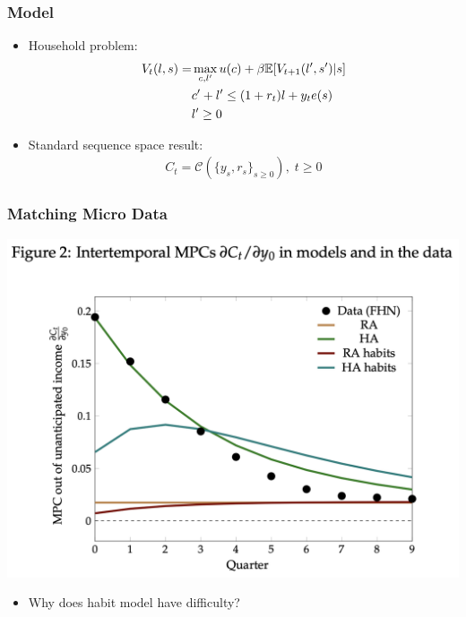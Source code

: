 \documentclass[english,xcolor=svgnames]{beamer}
\begin{document}
\begin{frame}
    \frametitle{Model}
    \begin{itemize}
        \item Household problem:
        \begin{align*}
        	V_t(l,s) = &\max_{c,l'}u(c)+\beta\mathbb{E}[V_{t+1}(l',s')|s] \\
        	&c'+l' \le (1+r_t)l + y_t e(s) \\
        	& l'\ge 0
        \end{align*}
        \item Standard sequence space result:
        \begin{align*}
        	C_t = \mathcal{C}(\{y_s,r_s\}_{s\ge 0}), \;t\ge 0
        \end{align*}
    \end{itemize}
\end{frame}

\begin{frame}
    \frametitle{Matching Micro Data}
    \begin{center}
    \includegraphics[scale=0.4]{figures/ARSFIG2.png}
    \end{center}
    \begin{itemize}
    	\item Why does habit model have difficulty?
    \end{itemize}
\end{frame}
\end{document}
